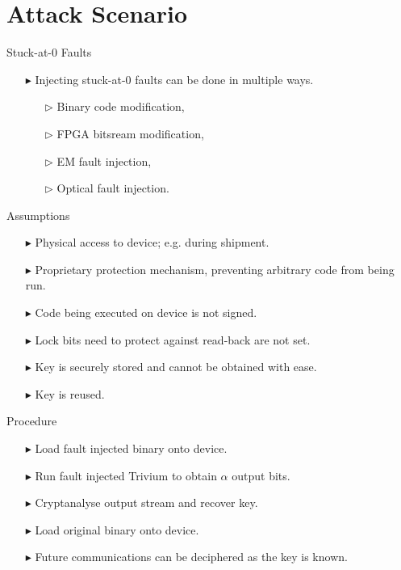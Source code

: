 \documentclass[10pt, compress]{beamer}
\begin{document}
\section{Attack Scenario}

\begin{frame}{Stuck-at-0 Faults}
\begin{itemize}
\item[$\blacktriangleright$] Injecting stuck-at-0 faults can be done in multiple ways.
\begin{itemize}
\item[$\triangleright$] Binary code modification,
\item[$\triangleright$] FPGA bitsream modification,
\item[$\triangleright$] EM fault injection, 
\item[$\triangleright$] Optical fault injection. 
\end{itemize}
\end{itemize}
\end{frame}

\begin{frame}{Assumptions}
\begin{itemize}[itemsep=0.5cm]
\item[$\blacktriangleright$] Physical access to device; e.g. during shipment.
\item[$\blacktriangleright$] Proprietary protection mechanism, preventing arbitrary code from being run.
\item[$\blacktriangleright$] Code being executed on device is not signed.
\item[$\blacktriangleright$] Lock bits need to protect against read-back are not set.
\item[$\blacktriangleright$] Key is securely stored and cannot be obtained with ease.
\item[$\blacktriangleright$] Key is reused.
\end{itemize}
\end{frame}

\begin{frame}{Procedure}
\begin{itemize}[itemsep=0.5cm]
\item[$\blacktriangleright$] Load fault injected binary onto device.
\item[$\blacktriangleright$] Run fault injected Trivium to obtain $\alpha$ output bits.
\item[$\blacktriangleright$] Cryptanalyse output stream and recover key.
\item[$\blacktriangleright$] Load original binary onto device.
\item[$\blacktriangleright$] Future communications can be deciphered as the key is known.
\end{itemize}
\end{frame}
\end{document}
